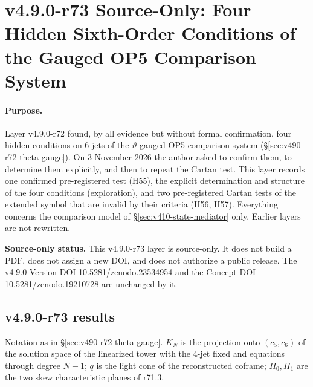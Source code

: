 \clearpage
\section*{v4.9.0-r73 Source-Only: Four Hidden Sixth-Order Conditions of the Gauged OP5 Comparison System}
\label{sec:v490-r73-hidden-conditions}

\paragraph{Purpose.}
Layer v4.9.0-r72 found, by all evidence but without formal confirmation, four hidden conditions on 6-jets of the
\(\vartheta\)-gauged OP5 comparison system (\S\ref{sec:v490-r72-theta-gauge}).  On 3 November 2026 the author asked to confirm
them, to determine them explicitly, and then to repeat the Cartan test.  This layer records one confirmed pre-registered test
(H55), the explicit determination and structure of the four conditions (exploration), and two pre-registered Cartan tests of
the extended symbol that are invalid by their criteria (H56, H57).  Everything concerns the comparison model of
\S\ref{sec:v410-state-mediator} only.  Earlier layers are not rewritten.

\noindent\textbf{Source-only status.}
This v4.9.0-r73 layer is source-only.  It does not build a PDF, does not assign a new DOI,
and does not authorize a public release.  The v4.9.0 Version DOI
\href{https://doi.org/10.5281/zenodo.23534954}{10.5281/zenodo.23534954} and the Concept DOI
\href{https://doi.org/10.5281/zenodo.19210728}{10.5281/zenodo.19210728} are unchanged by it.

\subsection*{v4.9.0-r73 results}
\label{subsec:v490-r73-results}

Notation as in \S\ref{sec:v490-r72-theta-gauge}.  \(K_N\) is the projection onto \((c_5,c_6)\) of the solution space of the
linearized tower with the 4-jet fixed and equations through degree \(N-1\); \(q\) is the light cone of the reconstructed
coframe; \(\Pi_0,\Pi_1\) are the two skew characteristic planes of r71.3.

